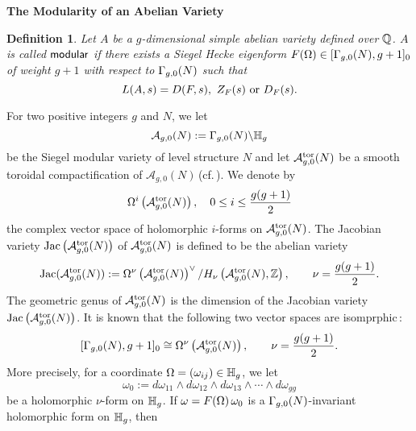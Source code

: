 \documentclass[11pt]{amsart}
\newtheorem{definition}[theorem]{Definition}
\begin{document}
\begin{section}{{\bf The Modularity of an Abelian Variety}}
\begin{definition}\label{def:2.6}
Let $A$ be a $g$-dimensional simple abelian variety defined over $\mathbb Q$.
$A$ is called $\sf{modular}$ if there exists a Siegel Hecke eigenform
$F(\Omega)\in [\Gamma_{g,0}(N), g+1]_0$
of weight $g+1$ with respect to $\Gamma_{g,0}(N)$ such that
\begin{equation*}
  L(A,s)=D(F,s),\ Z_F(s)\ {\rm or}\ D_F(s).
\end{equation*}
\end{definition}
\vskip 3mm
For two positive integers $g$ and $N$, we let
\begin{equation*}
 {\mathcal A}_{g,0}(N):=\Gamma_{g,0}(N)\backslash \mathbb H_g
\end{equation*}
be the Siegel modular variety of level structure $N$ and let
${\mathcal A}_{g,0}^{\rm tor}(N)$ be a smooth toroidal compactification of
${\mathcal A}_{g,0}(N)$\,(cf.\,\cite{AMRT, F-C}). We denote by
\begin{equation*}
 \Omega^i \left( {\mathcal A}_{g,0}^{\rm tor}(N)\right), \quad 0\leq i\leq \frac{g(g+1)}{2}
\end{equation*}
the complex vector space of holomorphic $i$-forms on ${\mathcal A}_{g,0}^{\rm tor}(N)$.
The Jacobian variety ${\rm Jac}\left( {\mathcal A}_{g,0}^{\rm tor}(N) \right)$ of
${\mathcal A}_{g,0}^{\rm tor}(N)$
is defined to be the abelian variety
\begin{equation}\label{(2.1)}
 {{\rm Jac}}({\mathcal A}_{g,0}^{\rm tor}(N)):=\Omega^{\nu}
 \left( {\mathcal A}_{g,0}^{\rm tor}(N) \right)^{\vee}
 / H_\nu \left( {\mathcal A}_{g,0}^{\rm tor}(N),\mathbb Z \right),\qquad \nu=\frac{g(g+1)}{2}.
\end{equation}
The geometric genus of ${\mathcal A}_{g,0}^{\rm tor}(N)$ is the dimension of
the Jacobian variety ${\rm Jac}\left( {\mathcal A}_{g,0}^{\rm tor}(N) \right)$.
It is known that the following two vector spaces are isomprphic\,:
\begin{equation}\label{(2.2)}
 [\Gamma_{g,0}(N),g+1]_0\cong \Omega^{\nu}
 \left( {\mathcal A}_{g,0}^{\rm tor}(N) \right),\qquad \nu=\frac{g(g+1)}{2}.
\end{equation}
More precisely, for a coordinate $\Omega=(\omega_{ij})\in \mathbb H_g$, we let
\begin{equation*}
  \omega_0:=d\omega_{11}\wedge d\omega_{12}\wedge d\omega_{13}\wedge \cdots \wedge
  d\omega_{gg}
\end{equation*}
be a holomorphic $\nu$-form on $\mathbb H_g$. If $\omega=F(\Omega)\,\omega_0$ is a $\Gamma_{g,0}(N)$-invariant
holomorphic form on $\mathbb H_g$,
then
\begin{equation*}

\end{equation*}
\end{section}
\end{document}

